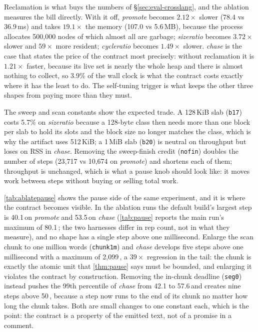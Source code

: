 Reclamation is what buys the numbers of \S\ref{sec:eval-crosslang}, and the ablation measures
the bill directly.  With it off, \emph{promote} becomes $2.12\times$ slower (78.4 vs 36.9\,ms) and
takes $19.1\times$ the memory (107.0 vs 5.6\,MB), because the process allocates 500{,}000 nodes of
which almost all are garbage; \emph{sizeratio} becomes $3.72\times$ slower and $59\times$ more
resident; \emph{cycleratio} becomes $1.49\times$ slower.  \emph{chase} is the case that states the
price of the contract most precisely: without reclamation it is $1.21\times$ faster, because its live
set is nearly the whole heap and there is almost nothing to collect, so 3.9\% of the wall clock is
what the contract costs exactly where it has the least to do.  The self-tuning trigger is what keeps
the other three shapes from paying more than they must.

The sweep and scan constants show the expected trade.  A 128\,KiB slab (\texttt{b17}) costs
5.7\% on \emph{sizeratio} because a 128-byte class then needs more than one block per slab to
hold its slots and the block size no longer matches the class, which is why the artifact uses
512\,KiB; a 1\,MiB slab (\texttt{b20}) is neutral on throughput but loses on RSS in
\emph{chase}.  Removing the sweep-finish credit (\texttt{nofin}) doubles the number of steps
(23{,}717 vs 10{,}674 on \emph{promote}) and shortens each of them; throughput is unchanged,
which is what a pause knob should look like: it moves work between steps without buying or
selling total work.



\tab\ref{tab:ablatepause} shows the pause side of the same experiment, and it is where the
contract becomes visible.  In the ablation runs the default build's largest step is 40.1\,\us on
\emph{promote} and 53.5\,\us on \emph{chase} (\tab\ref{tab:pause} reports the main run's
maximum of 80.1\,\us; the two harnesses differ in rep count, not in what they measure), and no
shape has a single step above one millisecond.  Enlarge the scan chunk to one million words
(\texttt{chunk1m}) and \emph{chase} develops five steps above one millisecond with a maximum of
2{,}099\,\us, a $39\times$ regression in the tail: the chunk is exactly the atomic unit that
\thm\ref{thm:pause} says must be bounded, and enlarging it violates the contract by
construction.  Removing the in-chunk deadline (\texttt{seg0}) instead pushes the 99th percentile
of \emph{chase} from 42.1 to 57.6\,\us and creates nine steps above 50\,\us, because a step now
runs to the end of its chunk no matter how long the chunk takes.  Both are small changes to one
constant each, which is the point: the contract is a property of the emitted text, not of a
promise in a comment.

